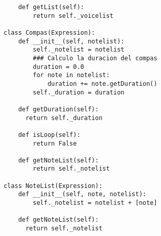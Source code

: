 \begin{verbatim}
    def getList(self):
        return self._voicelist

class Compas(Expression):
    def __init__(self, notelist):
        self._notelist = notelist
        ### Calculo la duracion del compas
        duration = 0.0
        for note in notelist:
            duration += note.getDuration()
        self._duration = duration

    def getDuration(self):
      return self._duration

    def isLoop(self):
        return False

    def getNoteList(self):
        return self._notelist

class NoteList(Expression):
    def __init__(self, note, notelist):
        self._notelist = notelist + [note]

    def getNoteList(self):
      return self._notelist

\end{verbatim}

